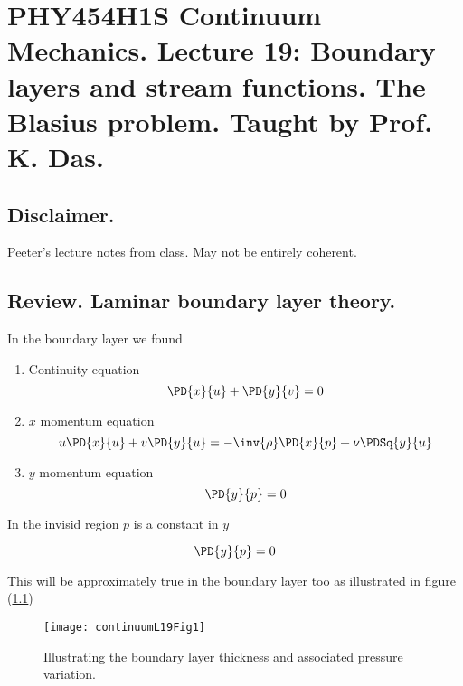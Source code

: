 
%

\chapter{PHY454H1S Continuum Mechanics.  Lecture 19: Boundary layers and stream functions.  The Blasius problem.  Taught by Prof. K. Das.}
\label{chap:continuumL19}
{}
\date{Mar 23, 2012}

\beginArtWithToc

\section{Disclaimer.}

Peeter's lecture notes from class.  May not be entirely coherent.

\section{Review.  Laminar boundary layer theory.}

In the boundary layer we found
\begin{enumerate}
\item Continuity equation
\begin{equation}\label{eqn:continuumL19:10}
\PD{x}{u} + \PD{y}{v} = 0
\end{equation}
\item $x$ momentum equation
\begin{equation}\label{eqn:continuumL19:30}
u \PD{x}{u} + v \PD{y}{u} = - \inv{\rho} \PD{x}{p} + \nu \PDSq{y}{u}
\end{equation}
\item $y$ momentum equation
\begin{equation}\label{eqn:continuumL19:50}
\PD{y}{p} = 0
\end{equation}
\end{enumerate}

In the invisid region $p$ is a constant in $y$

\begin{equation}\label{eqn:continuumL19:70}
\PD{y}{p} = 0
\end{equation}

This will be approximately true in the boundary layer too as illustrated in figure (\ref{fig:continuumL19:continuumL19Fig1})
\begin{figure}[htp]
   \centering
   \texttt{[image: continuumL19Fig1]}
   \caption{Illustrating the boundary layer thickness and associated pressure variation.}\label{fig:continuumL19:continuumL19Fig1}
\end{figure}

